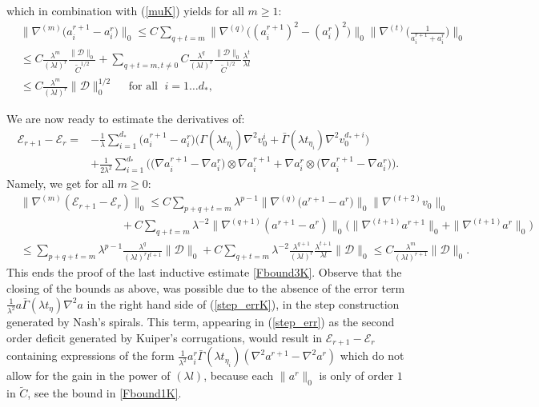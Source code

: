 \documentclass[reqno,twoside,11pt]{amsart}
\numberwithin{equation}{section}
\theoremstyle{plain}
\theoremstyle{definition}
\begin{document}
which in combination with (\ref{muK}) yields for all $m\geq 1$:
\begin{equation}\label{mu2K}
\begin{split}
& \|\nabla^{(m)}\big(a_i^{r+1}-a_i^{r}\big)\|_0\leq C \sum_{q+t=m}
\|\nabla^{(q)}\big((a_i^{r+1})^2-(a_i^{r})^2\big)\|_0 
\|\nabla^{(t)}\Big(\frac{1}{a^{r+1}_i+a^{r}_i}\Big)\|_0 \\ & \leq 
C \frac{\lambda^{m}}{(\lambda l)^{r}}\frac{\|\mathcal{D}\|_0}{\tilde C^{1/2}} 
+ \sum_{q+t=m, t\neq 0} C \frac{\lambda^{q}}{(\lambda
  l)^{r}}\frac{\|\mathcal{D}\|_0}{\tilde C^{1/2}} \frac{\lambda^t}{\lambda l}
\\ & \leq C\frac{\lambda^m}{(\lambda l)^{r}}\|\mathcal{D}\|_0^{1/2} 
\quad\mbox{ for all }\; i=1\ldots d_*,
\end{split}
\end{equation}

We are now ready to estimate the derivatives of:
\begin{equation*}
\begin{split}
\mathcal{E}_{r+1}-\mathcal{E}_r = & -\frac{1}{\lambda}
\sum_{i=1}^{d_*}\big(a_i^{r+1}-a_i^{r}\big) \Big(\Gamma(\lambda t_{\eta_i})\nabla^2 v_0^i + 
\bar\Gamma(\lambda t_{\eta_i})\nabla^2 v_0^{d_*+i}\Big)  \\ & +
\frac{1}{2\lambda^2} \sum_{i=1}^{d_*} \Big(\big(\nabla a_i^{r+1} - \nabla a_i^r\big)\otimes \nabla a_i^{r+1} + 
\nabla a_i^r \otimes \big(\nabla a_i^{r+1} - \nabla a_i^r\big)\Big).
\end{split}
\end{equation*}
Namely, we get for all $m\geq 0$:
\begin{equation*}
\begin{split}
& \|\nabla^{(m)}(\mathcal{E}_{r+1}-\mathcal{E}_r)\|_0 \leq  C 
\sum_{p+q+t=m}\lambda^{p-1}
\|\nabla^{(q)}\big(a^{r+1}-a^{r}\big)\|_0 \|\nabla^{(t+2)}v_0\|_0
\\ & \qquad\qquad\qquad\qquad \quad
+ C \sum_{q+t=m} \lambda^{-2} \|\nabla^{(q+1)} (a^{r+1} - a^r)\|_0
\big(\|\nabla^{(t+1)} a^{r+1} \|_0+ \|\nabla^{(t+1)} a^{r} \|_0\big)
\\ & \leq \sum_{p+q+t=m}\lambda^{p-1} \frac{\lambda^q}{(\lambda l)^{r}l^{t+1}}\|\mathcal{D}\|_0 
+ C \sum_{q+t=m} \lambda^{-2} \frac{\lambda^{q+1}}{(\lambda l)^{r}}
\frac{\lambda^{t+1}}{\lambda l} \|\mathcal{D}\|_0 \leq C
\frac{\lambda^{m}}{(\lambda l)^{r+1}} \|\mathcal{D}\|_0.
\end{split}
\end{equation*}
This ends the proof of the last inductive estimate \ref{Fbound3K}. Observe that the closing of the
bounds as above, was possible due to the absence of the error term
$\frac{1}{\lambda^2} a\bar\Gamma(\lambda t_\eta)\nabla^2a$ in the right
hand side of (\ref{step_errK}), in the step construction generated by Nash's spirals. This term, appearing in
(\ref{step_err}) as the second order deficit generated by Kuiper's corrugations, would result in 
$\mathcal{E}_{r+1}-\mathcal{E}_r$ containing expressions of the form 
$\frac{1}{\lambda^2} a_i^r\bar\Gamma(\lambda t_{\eta_i})(\nabla^2
a^{r+1}-\nabla^2 a^r)$ which do not allow for the gain in the power
of $(\lambda l)$, because each $\|a^r\|_0$ is only of order $1$ in $\tilde
C$, see the bound in \ref{Fbound1K}.
\end{document}
